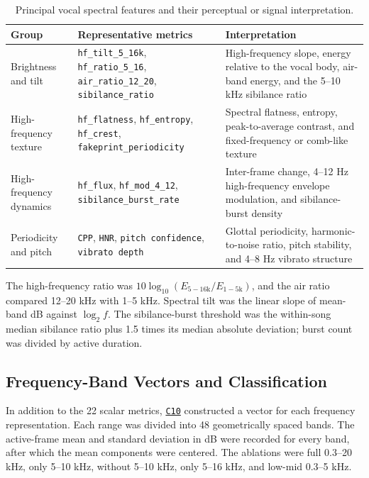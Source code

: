 \documentclass[11pt,a4paper]{article}
\newcommand{\coderef}[1]{\hyperlink{code:#1}{\texttt{#1}}}
\begin{document}
\begin{table}[H]
\centering
\small
\caption{Principal vocal spectral features and their perceptual or signal interpretation.}
\label{tab:metrics}
\begin{tabularx}{\linewidth}{p{34mm}p{49mm}X}
\toprule
Group & Representative metrics & Interpretation \\
\midrule
Brightness and tilt & \texttt{hf\_tilt\_5\_16k}, \texttt{hf\_ratio\_5\_16}, \texttt{air\_ratio\_12\_20}, \texttt{sibilance\_ratio} & High-frequency slope, energy relative to the vocal body, air-band energy, and the 5--10 kHz sibilance ratio \\
High-frequency texture & \texttt{hf\_flatness}, \texttt{hf\_entropy}, \texttt{hf\_crest}, \texttt{fakeprint\_periodicity} & Spectral flatness, entropy, peak-to-average contrast, and fixed-frequency or comb-like texture \\
High-frequency dynamics & \texttt{hf\_flux}, \texttt{hf\_mod\_4\_12}, \texttt{sibilance\_burst\_rate} & Inter-frame change, 4--12 Hz high-frequency envelope modulation, and sibilance-burst density \\
Periodicity and pitch & \texttt{CPP}, \texttt{HNR}, \texttt{pitch confidence}, \texttt{vibrato depth} & Glottal periodicity, harmonic-to-noise ratio, pitch stability, and 4--8 Hz vibrato structure \\
\bottomrule
\end{tabularx}
\end{table}

The high-frequency ratio was $10\log_{10}(E_{5-16\mathrm{k}}/E_{1-5\mathrm{k}})$, and the air ratio compared 12--20 kHz with 1--5 kHz. Spectral tilt was the linear slope of mean-band dB against $\log_2 f$. The sibilance-burst threshold was the within-song median sibilance ratio plus 1.5 times its median absolute deviation; burst count was divided by active duration.

\subsection{Frequency-Band Vectors and Classification}

In addition to the 22 scalar metrics, \coderef{C10} constructed a vector for each frequency representation. Each range was divided into 48 geometrically spaced bands. The active-frame mean and standard deviation in dB were recorded for every band, after which the mean components were centered. The ablations were full 0.3--20 kHz, only 5--10 kHz, without 5--10 kHz, only 5--16 kHz, and low-mid 0.3--5 kHz.
\end{document}
